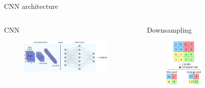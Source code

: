 \documentclass[10pt,aspectratio=169,dvipsnames]{beamer} %
\begin{document}
	\begin{frame}{CNN architecture}
		\begin{columns}[T]
			\begin{column}[c]{0.7\textwidth}
				\begin{block}{CNN}
					\begin{figure}
						\centering
						\includegraphics[width=0.9\textwidth]{cnn_ann.png}
					\end{figure}
				\end{block}
			\end{column}
		\begin{column}[c]{0.3\textwidth}
			\begin{block}{Downsampling}
					\begin{figure}
						\includegraphics[width=0.5\textwidth]{downsampling.png}
					\end{figure}
				\end{block}
			\end{column}
		\end{columns}
	\end{frame}
\end{document}
